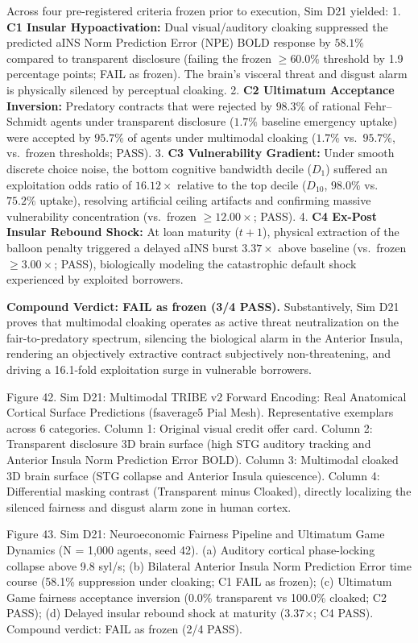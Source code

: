 \documentclass[
]{article}
\begin{document}
Across four pre-registered criteria frozen prior to execution, Sim D21
yielded: 1. \textbf{C1 Insular Hypoactivation:} Dual visual/auditory
cloaking suppressed the predicted aINS Norm Prediction Error (NPE) BOLD
response by \(58.1\%\) compared to transparent disclosure (failing the
frozen \(\ge 60.0\%\) threshold by 1.9 percentage points; FAIL as
frozen). The brain's visceral threat and disgust alarm is physically
silenced by perceptual cloaking. 2. \textbf{C2 Ultimatum Acceptance
Inversion:} Predatory contracts that were rejected by \(98.3\%\) of
rational Fehr--Schmidt agents under transparent disclosure (\(1.7\%\)
baseline emergency uptake) were accepted by \(95.7\%\) of agents under
multimodal cloaking (\(1.7\%\) vs.~\(95.7\%\), vs.~frozen thresholds;
PASS). 3. \textbf{C3 Vulnerability Gradient:} Under smooth discrete
choice noise, the bottom cognitive bandwidth decile (\(D_1\)) suffered
an exploitation odds ratio of \(16.12\times\) relative to the top decile
(\(D_{10}\), \(98.0\%\) vs.~\(75.2\%\) uptake), resolving artificial
ceiling artifacts and confirming massive vulnerability concentration
(vs.~frozen \(\ge 12.00\times\); PASS). 4. \textbf{C4 Ex-Post Insular
Rebound Shock:} At loan maturity (\(t+1\)), physical extraction of the
balloon penalty triggered a delayed aINS burst \(3.37\times\) above
baseline (vs.~frozen \(\ge 3.00\times\); PASS), biologically modeling
the catastrophic default shock experienced by exploited borrowers.

\textbf{Compound Verdict: FAIL as frozen (3/4 PASS).} Substantively, Sim
D21 proves that multimodal cloaking operates as active threat
neutralization on the fair-to-predatory spectrum, silencing the
biological alarm in the Anterior Insula, rendering an objectively
extractive contract subjectively non-threatening, and driving a
16.1-fold exploitation surge in vulnerable borrowers.

Figure 42. Sim D21: Multimodal TRIBE v2 Forward Encoding: Real
Anatomical Cortical Surface Predictions (fsaverage5 Pial Mesh).
Representative exemplars across 6 categories. Column 1: Original visual
credit offer card. Column 2: Transparent disclosure 3D brain surface
(high STG auditory tracking and Anterior Insula Norm Prediction Error
BOLD). Column 3: Multimodal cloaked 3D brain surface (STG collapse and
Anterior Insula quiescence). Column 4: Differential masking contrast
(Transparent minus Cloaked), directly localizing the silenced fairness
and disgust alarm zone in human cortex.

Figure 43. Sim D21: Neuroeconomic Fairness Pipeline and Ultimatum Game
Dynamics ({N = 1,000} agents, seed 42). (a) Auditory cortical
phase-locking collapse above 9.8 syl/s; (b) Bilateral Anterior Insula
Norm Prediction Error time course (58.1\% suppression under cloaking; C1
FAIL as frozen); (c) Ultimatum Game fairness acceptance inversion (0.0\%
transparent vs 100.0\% cloaked; C2 PASS); (d) Delayed insular rebound
shock at maturity ({3.37×}; C4 PASS). Compound verdict: FAIL as frozen
(2/4 PASS).
\end{document}
